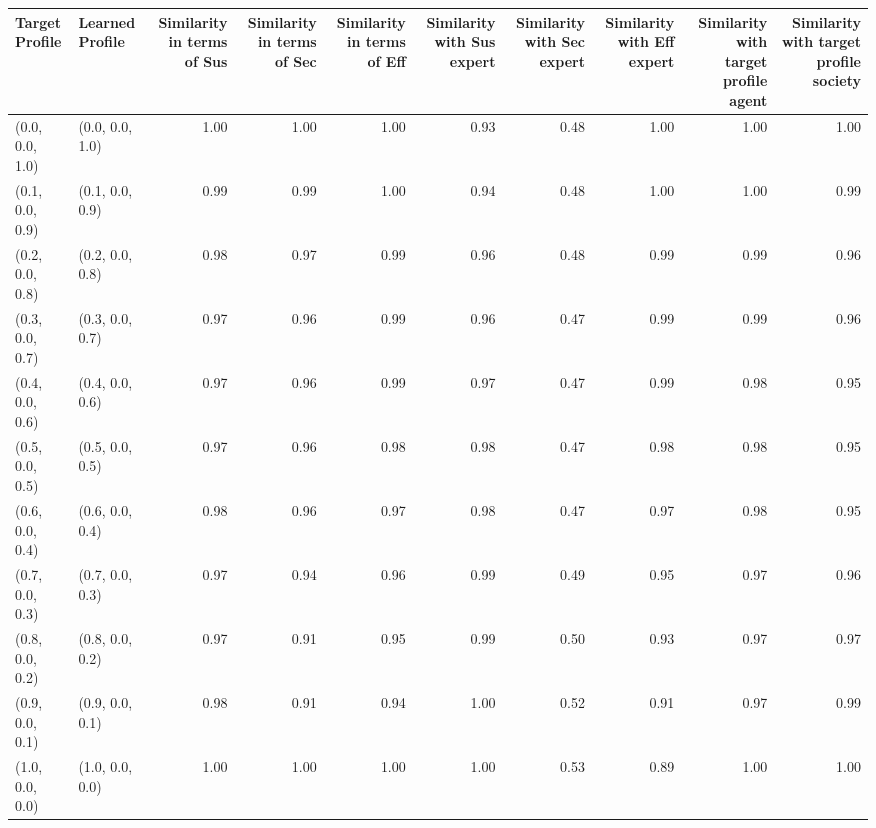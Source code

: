\begin{tabular}{llrrrrrrrr}
\toprule
Target Profile & Learned Profile & Similarity in terms of Sus & Similarity in terms of Sec & Similarity in terms of Eff & Similarity with Sus expert & Similarity with Sec expert & Similarity with Eff expert & Similarity with target profile agent & Similarity with target profile society \\
\midrule
(0.0, 0.0, 1.0) & (0.0, 0.0, 1.0) & 1.00 & 1.00 & 1.00 & 0.93 & 0.48 & 1.00 & 1.00 & 1.00 \\
(0.1, 0.0, 0.9) & (0.1, 0.0, 0.9) & 0.99 & 0.99 & 1.00 & 0.94 & 0.48 & 1.00 & 1.00 & 0.99 \\
(0.2, 0.0, 0.8) & (0.2, 0.0, 0.8) & 0.98 & 0.97 & 0.99 & 0.96 & 0.48 & 0.99 & 0.99 & 0.96 \\
(0.3, 0.0, 0.7) & (0.3, 0.0, 0.7) & 0.97 & 0.96 & 0.99 & 0.96 & 0.47 & 0.99 & 0.99 & 0.96 \\
(0.4, 0.0, 0.6) & (0.4, 0.0, 0.6) & 0.97 & 0.96 & 0.99 & 0.97 & 0.47 & 0.99 & 0.98 & 0.95 \\
(0.5, 0.0, 0.5) & (0.5, 0.0, 0.5) & 0.97 & 0.96 & 0.98 & 0.98 & 0.47 & 0.98 & 0.98 & 0.95 \\
(0.6, 0.0, 0.4) & (0.6, 0.0, 0.4) & 0.98 & 0.96 & 0.97 & 0.98 & 0.47 & 0.97 & 0.98 & 0.95 \\
(0.7, 0.0, 0.3) & (0.7, 0.0, 0.3) & 0.97 & 0.94 & 0.96 & 0.99 & 0.49 & 0.95 & 0.97 & 0.96 \\
(0.8, 0.0, 0.2) & (0.8, 0.0, 0.2) & 0.97 & 0.91 & 0.95 & 0.99 & 0.50 & 0.93 & 0.97 & 0.97 \\
(0.9, 0.0, 0.1) & (0.9, 0.0, 0.1) & 0.98 & 0.91 & 0.94 & 1.00 & 0.52 & 0.91 & 0.97 & 0.99 \\
(1.0, 0.0, 0.0) & (1.0, 0.0, 0.0) & 1.00 & 1.00 & 1.00 & 1.00 & 0.53 & 0.89 & 1.00 & 1.00 \\
\bottomrule
\end{tabular}
